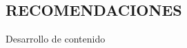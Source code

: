 \medspace
\vspace{1.5cm}
\begin{center}
	\section*{\large RECOMENDACIONES}
\end{center}

\vspace{1cm}

Desarrollo de contenido